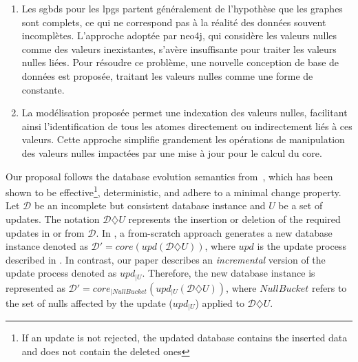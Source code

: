 \begin{description}[wide]
\begin{enumerate}
        \item Les \glspl{sgbd} pour les \glspl{lpg} partent généralement de l'hypothèse que les graphes sont complets, ce qui ne correspond pas à la réalité des données souvent incomplètes.
        L'approche adoptée par \gls{neo4j}, qui considère les valeurs nulles comme des valeurs inexistantes, s'avère insuffisante pour traiter les valeurs nulles liées.
        Pour résoudre ce problème, une nouvelle conception de base de données est proposée, traitant les valeurs nulles comme une forme de constante.
        
        \item La modélisation proposée permet une indexation des valeurs nulles, facilitant ainsi l'identification de tous les atomes directement ou indirectement liés à ces valeurs.
        Cette approche simplifie grandement les opérations de manipulation des valeurs nulles impactées par une mise à jour pour le calcul du \gls{core}.
    \end{enumerate}
\end{description}

Our proposal follows the database evolution semantics from~\cite{chabinConsistentUpdatingDatabases2020}, which has been shown to be effective\footnote{If an update is not rejected, the updated database contains the inserted data and does not contain the deleted ones}, deterministic, and adhere to a minimal change property.
Let $\mathcal{D}$ be an incomplete but consistent database instance and $U$ be a set of updates.
The notation $\mathcal{D} \diamondsuit U$ represents the insertion or deletion of the required updates in or from $\mathcal{D}$.
In \cite{CHL20}, a from-scratch approach generates a new database instance denoted as $\mathcal{D}' = core(upd(\mathcal{D} \diamondsuit U))$, where $upd$ is the update process described in \cite{chabinConsistentUpdatingDatabases2020}.
In contrast, our paper describes an \textit{incremental} version of the update process denoted as $upd_{|U}$.
Therefore, the new database instance is represented as $\mathcal{D}' = core_{|NullBucket}(upd_{|U}(\mathcal{D}\diamondsuit U))$, where $NullBucket$ refers to the set of nulls affected by the update ($upd_{|U}$) applied to $\mathcal{D} \diamondsuit U$.
